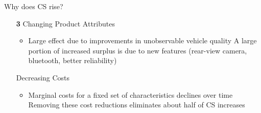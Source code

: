 \documentclass{beamer}
\begin{document}
\begin{frame}{Why does CS rise?}
  \begin{itemize}
  \item[\textbf{3}] Changing Product Attributes
    \begin{itemize}
    \item Large effect due to improvements in unobservable vehicle quality
      \vitem A large portion of increased surplus is due to new features (rear-view camera, bluetooth, better reliability)
    \end{itemize}
  \vitem[\textbf{4}] Decreasing Costs
    \begin{itemize}
    \item Marginal costs for a fixed set of characteristics declines over time
      \vitem Removing these cost reductions eliminates about half of CS increases
    \end{itemize}
  \end{itemize}
\end{frame}
\end{document}

